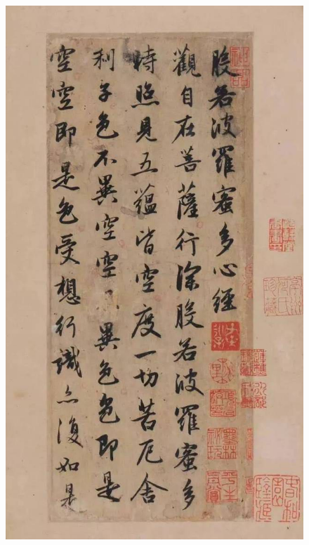\documentclass[a4paper,twoside]{article}
\begin{document}
\begin{figure}[ht]
\centering
\includegraphics[width=13.2cm]{images/zhaomengfu-1}
\end{figure}
\end{document}
